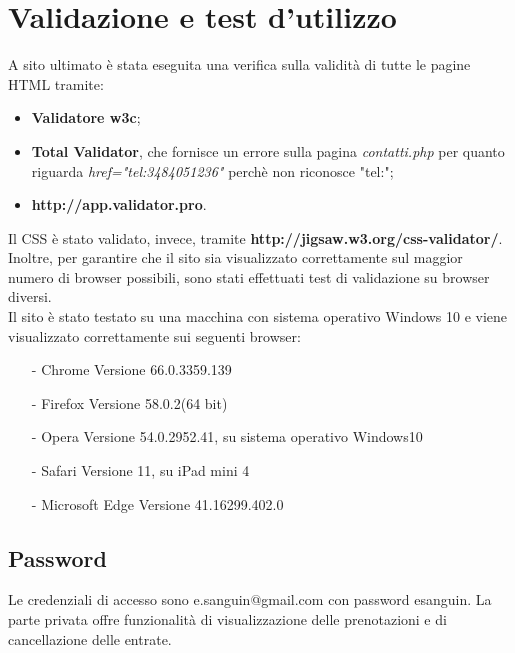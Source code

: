 \section{Validazione e test d'utilizzo}
A sito ultimato è stata eseguita una verifica sulla validità di tutte le pagine HTML tramite:
\begin{itemize}
\item \textbf{Validatore w3c};
\item \textbf{Total Validator}, che fornisce un errore sulla pagina \textit{contatti.php} per quanto riguarda \textit{href="tel:3484051236"} perchè non riconosce "tel:";
\item \textbf{http://app.validator.pro}.
\end{itemize}
Il CSS è stato validato, invece, tramite \textbf{http://jigsaw.w3.org/css-validator/}.
Inoltre, per garantire che il sito sia visualizzato correttamente sul maggior numero di browser possibili, sono stati effettuati test di validazione su browser diversi.
\\
Il sito è stato testato su una macchina con sistema operativo Windows 10 e viene visualizzato correttamente sui seguenti browser:
\begin{itemize}
	\item [-] Chrome Versione 66.0.3359.139
	\item [-] Firefox Versione 58.0.2(64 bit)
	\item [-] Opera Versione 54.0.2952.41, su sistema operativo Windows10
	\item [-] Safari Versione 11, su iPad mini 4
	\item [-] Microsoft Edge Versione 41.16299.402.0
\end{itemize}
\subsection{Password}
Le credenziali di accesso sono  e.sanguin@gmail.com  con password esanguin. La parte privata offre funzionalità di visualizzazione delle prenotazioni e di cancellazione delle entrate. 
